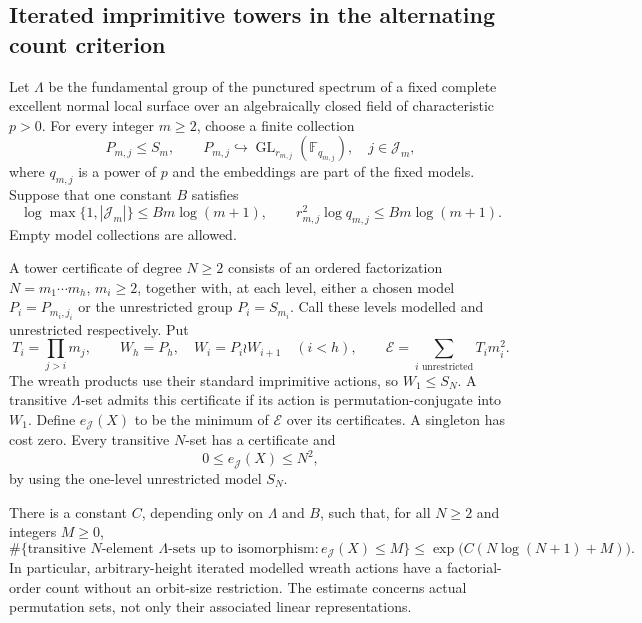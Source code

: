 \subsection{Iterated imprimitive towers in the alternating count criterion}

\begin{proposition}
\label{D:hereditary-wreath-permutation-count}
Let $\Lambda$ be the fundamental group of the punctured
spectrum of a fixed complete excellent normal local surface
over an algebraically closed field of characteristic $p>0$.
For every integer $m\ge2$, choose a finite collection
\[
 P_{m,j}\le S_m,\qquad
 P_{m,j}\hookrightarrow
       \operatorname{GL}_{r_{m,j}}(\mathbb F_{q_{m,j}}),
                 \quad j\in\mathcal J_m,                \tag{D.WO.1}
\]
where $q_{m,j}$ is a power of $p$ and the embeddings are
part of the fixed models. Suppose that one constant $B$
satisfies
\[
 \log\max\{1,|\mathcal J_m|\}\le Bm\log(m+1),\qquad
 r_{m,j}^2\log q_{m,j}\le Bm\log(m+1).                  \tag{D.WO.2}
\]
Empty model collections are allowed.

A tower certificate of degree $N\ge2$ consists of an ordered
factorization $N=m_1\cdots m_h$, $m_i\ge2$, together with,
at each level, either a chosen model $P_i=P_{m_i,j_i}$
or the unrestricted group $P_i=S_{m_i}$. Call these levels
modelled and unrestricted respectively. Put
\[
 T_i=\prod_{j>i}m_j,\qquad
 W_h=P_h,\quad W_i=P_i\wr W_{i+1}\quad(i<h),\qquad
 \mathcal E=\sum_{i\text{ unrestricted}}T_i m_i^2.
                                                        \tag{D.WO.3}
\]
The wreath products use their standard imprimitive actions,
so $W_1\le S_N$. A transitive $\Lambda$-set admits this
certificate if its action is permutation-conjugate into
$W_1$. Define $e_{\mathcal J}(X)$ to be the minimum of
$\mathcal E$ over its certificates. A singleton has cost
zero. Every transitive $N$-set has a certificate and
\[
                     0\le e_{\mathcal J}(X)\le N^2,     \tag{D.WO.4}
\]
by using the one-level unrestricted model $S_N$.

There is a constant $C$, depending only on $\Lambda$ and
$B$, such that, for all $N\ge2$ and integers $M\ge0$,
\[
 \#\{\text{transitive $N$-element $\Lambda$-sets up to
 isomorphism}:e_{\mathcal J}(X)\le M\}
       \le\exp\bigl(C(N\log(N+1)+M)\bigr).             \tag{D.WO.5}
\]
In particular, arbitrary-height iterated modelled wreath
actions have a factorial-order count without an orbit-size
restriction. The estimate concerns actual permutation
sets, not only their associated linear representations.
\end{proposition}

